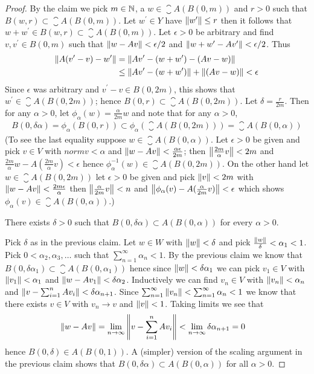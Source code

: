 \begin{proof}
By the claim we pick $m \in \mathbb{N}$, a $w \in \closure{A(B(0, m))}$ and $r > 0$ such that $B(w, r) \subset \closure{A(B(0, m))}$.   Let $w^\prime \in Y$ have $\left \lVert w^\prime \right \rVert \leq r$ then it follows that $w + w^\prime \in B(w, r) \subset \closure{A(B(0, m))}$.   Let $\epsilon > 0$ be arbitrary and find $v, v^\prime \in B(0, m)$ such that $\left \lVert w - A v \right \rVert < \epsilon/2$ and 
$\left \lVert w + w^\prime - A v^\prime \right \rVert < \epsilon/2$.  Thus
\begin{align*}
\left \lVert A (v^\prime - v) - w^\prime \right \rVert &= \left \lVert A v^\prime - (w + w^\prime) - (A v - w)  \right \rVert \\
&\leq \left \lVert A v^\prime - (w + w^\prime)  \right \rVert + \left \lVert  (A v - w)  \right \rVert  < \epsilon
\end{align*}
Since $\epsilon$ was arbitrary and $v^\prime - v \in B(0, 2m)$, this shows that $w^\prime \in \closure{A(B(0,2m))}$; hence $B(0, r) \subset \closure{A(B(0,2m))}$.  Let $\delta = \frac{r}{2m}$.  Then for any $\alpha > 0$, let $\phi_\alpha(w) = \frac{\alpha}{2m} w$ and note that for any $\alpha>0$,
\begin{align*}
B(0, \delta \alpha) = \phi_\alpha(B(0, r)) \subset \phi_\alpha(\closure{A(B(0,2m))}) = \closure{A(B(0,\alpha))}
\end{align*}
(To see the last equality suppose $w \in \closure{A(B(0,\alpha))}$.  Let $\epsilon > 0$ be given and pick $v \in V$ with $norm{v} < \alpha$ and $\left \lVert w - Av \right \rVert < \frac{\alpha\epsilon}{2m}$; then $\left \lVert \frac{2m}{\alpha} v \right \rVert < 2m$ and ${\frac{2m}{\alpha} w - A(\frac{2m}{\alpha} v)} < \epsilon$ hence $\phi_\alpha^{-1}(w) \in \closure{A(B(0,2m))}$.  On the other hand let $w \in \closure{A(B(0,2m))}$ let $\epsilon>0$ be given and pick $\left \lVert v \right \rVert < 2m$ with $\left \lVert w - A v \right \rVert < \frac{2m\epsilon}{\alpha}$ then $\left \lVert \frac{\alpha}{2m} v \right \rVert < n$ and $\left \lVert \phi_\alpha(v) - A (\frac{\alpha}{2m} v) \right \rVert < \epsilon$ which shows $\phi_\alpha(v)  \in \closure{A(B(0,\alpha))}$.)

\begin{clm}There exists $\delta > 0$ such that $B(0,\delta \alpha) \subset  A(B(0,\alpha))$ for every $\alpha > 0$.
\end{clm}
Pick $\delta$ as in the previous claim.  Let $w \in W$ with $\left \lVert w \right \rVert < \delta$ and pick $\frac{\left \lVert w \right \rVert}{\delta} < \alpha_1 < 1$.  Pick $0 < \alpha_2, \alpha_3, \dotsc$ such that $\sum_{n=1}^\infty \alpha_n < 1$.  By the previous claim we know that $B(0, \delta \alpha_1) \subset \closure{A(B(0,\alpha_1))}$ hence since $\left \lVert w \right \rVert < \delta \alpha_1$ we can pick $v_1 \in V$ with $\left \lVert v_1 \right \rVert < \alpha_1$ and $\left \lVert w - Av_1 \right \rVert < \delta \alpha_2$.  Inductively we can find $v_n \in V$ with $\left \lVert v_n \right \rVert < \alpha_n$ and $\left \lVert v - \sum_{i=1}^n A v_i \right \rVert < \delta \alpha_{n+1}$.  Since $\sum_{n=1}^\infty \left \lVert v_n \right \rVert < \sum_{n=1}^\infty \alpha_n < 1$ we know that there exists $v \in V$ with $v_n \to v$ and $\left \lVert v \right \rVert < 1$.  Taking limits we see that
\begin{align*}
\left \lVert w - Av \right \rVert &= \lim_{n \to \infty} \left \lVert v - \sum_{i=1}^n A v_i \right \rVert < \lim_{n \to \infty} \delta \alpha_{n+1} = 0
\end{align*}
hence $B(0, \delta) \in A(B(0,1))$.  A (simpler) version of the scaling argument in the previous claim shows that $B(0, \delta \alpha) \subset A(B(0, \alpha))$ for all $\alpha>0$.


\end{proof}
